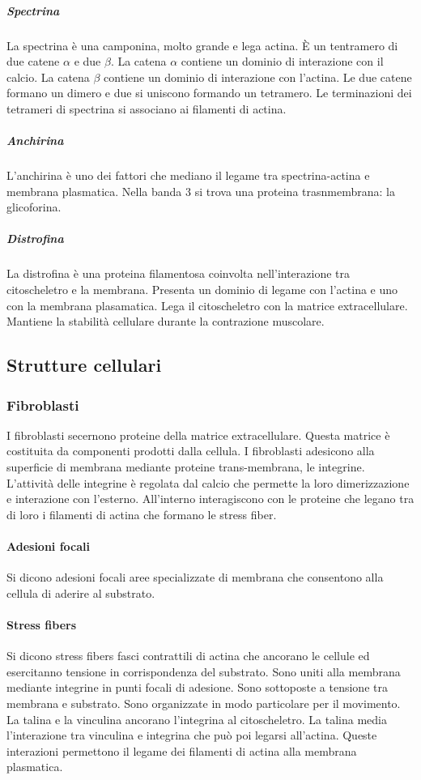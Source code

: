 				\subparagraph{Spectrina}
				La spectrina \`e una camponina, molto grande e lega actina.
				\`E un tentramero di due catene $\alpha$ e due $\beta$.
				La catena $\alpha$ contiene un dominio di interazione con il calcio.
				La catena $\beta$ contiene un dominio di interazione con l'actina.
				Le due catene formano un dimero e due si uniscono formando un tetramero.
				Le terminazioni dei tetrameri di spectrina si associano ai filamenti di actina.

				\subparagraph{Anchirina}
				L'anchirina \`e uno dei fattori che mediano il legame tra spectrina-actina e membrana plasmatica.
				Nella banda $3$ si trova una proteina trasnmembrana: la glicoforina.

				\subparagraph{Distrofina}
				La distrofina \`e una proteina filamentosa coinvolta nell'interazione tra citoscheletro e la membrana.
				Presenta un dominio di legame con l'actina e uno con la membrana plasamatica.
				Lega il citoscheletro con la matrice extracellulare.
				Mantiene la stabilit\`a cellulare durante la contrazione muscolare.

	\subsection{Strutture cellulari}

		\subsubsection{Fibroblasti}
		I fibroblasti secernono proteine della matrice extracellulare.
		Questa matrice \`e costituita da componenti prodotti dalla cellula.
		I fibroblasti adesicono alla superficie di membrana mediante proteine trans-membrana, le integrine.
		L'attivit\`a delle integrine \`e regolata dal calcio che permette la loro dimerizzazione e interazione con l'esterno.
		All'interno interagiscono con le proteine che legano tra di loro i filamenti di actina che formano le stress fiber.

			\paragraph{Adesioni focali}
			Si dicono adesioni focali aree specializzate di membrana che consentono alla cellula di aderire al substrato.

			\paragraph{Stress fibers}
			Si dicono stress fibers fasci contrattili di actina che ancorano le cellule ed esercitanno tensione in corrispondenza del substrato.
			Sono uniti alla membrana mediante integrine in punti focali di adesione.
			Sono sottoposte a tensione tra membrana e substrato.
			Sono organizzate in modo particolare per il movimento.
			La talina e la vinculina ancorano l'integrina al citoscheletro.
			La talina media l'interazione tra vinculina e integrina che pu\`o poi legarsi all'actina.
			Queste interazioni permettono il legame dei filamenti di actina alla membrana plasmatica.

